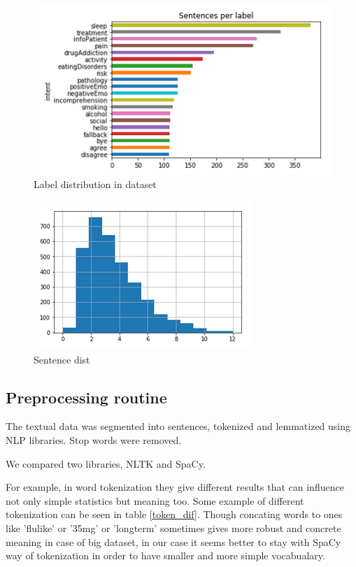 \documentclass[11pt]{article}
\begin{document}
 \begin{figure}[h]
 	\centering
 	\includegraphics[scale=0.5]{report1.png}
	\caption{Label distribution in dataset}
 \label{figure:name}
 \end{figure}
\FloatBarrier



 \begin{figure}[h]
 	\centering
 	\includegraphics[scale=0.4]{report4.png}
	\caption{Sentence dist}
 \label{words_freq}
 \end{figure}
 \FloatBarrier


\subsection{Preprocessing routine}

The textual data was segmented into sentences, tokenized and lemmatized using NLP
libraries. Stop words were removed.

We compared two libraries, NLTK and SpaCy.

For example, in word tokenization they give different results that can influence not only simple statistics but meaning too. Some example of different tokenization can be seen in table \ref{token_dif}. Though concating words to ones like 'flulike' or '35mg' or 'longterm' sometimes gives more robust and concrete meaning in case of big dataset, in our case it seems better to stay with SpaCy way of tokenization in order to have smaller and more simple vocabualary.
\end{document}
